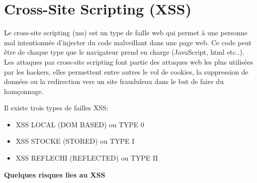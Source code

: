 

\newpage
\section{Cross-Site Scripting (XSS)}\label{vulnerabilites:web:xss}

Le cross-site scripting (xss) est un type de faille web qui permet à une personne mal intentionnée d'injecter du code malveillant dans une page web. Ce code peut être de chaque type que le navigateur prend en charge (JavaScript, html etc..). Les attaques par cross-site scripting font partie des attaques web les plus utilisées par les hackers, elles permettent entre autres le vol de cookies, la suppression de données ou la redirection vers un site frauduleux dans le but de faire du hamçonnage.

\bigskip

\begin{flushleft}
Il existe trois types de failles XSS:
\end{flushleft}
\begin{itemize}
\item XSS LOCAL (DOM BASED) ou TYPE 0
\item XSS STOCKE (STORED) ou TYPE I
\item XSS REFLECHI (REFLECTED) ou TYPE II
\end{itemize}

\bigskip

\begin{flushleft}
\textbf{Quelques risques lies au XSS}
\end{flushleft}

\smallskip

